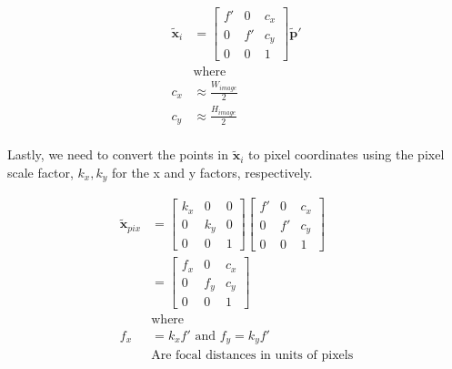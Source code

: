 \begin{equation}
    \begin{aligned}
        \tilde{\mathbf{x}}_{i} &= \begin{bmatrix}
            f' & 0 & c_x \\ 0 & f' & c_y \\ 0 & 0 & 1 
        \end{bmatrix} \tilde{\mathbf{p}}' \\
        &\text{where} \\
        c_x &\approx \frac{W_{image}}{2} \\
        c_y &\approx \frac{H_{image}}{2} \\
    \end{aligned}
    \label{eq:perspective-projection}
\end{equation}

Lastly, we need to convert the points in $\tilde{\mathbf{x}}_i$ to pixel coordinates using the pixel scale factor, $k_x,k_y$ for the x and y factors, respectively.

\begin{equation}
    \begin{aligned}
        \tilde{\mathbf{x}}_{pix} &= \begin{bmatrix}
            k_x & 0& 0 \\ 0 & k_y & 0 \\ 0 & 0 & 1
        \end{bmatrix} \begin{bmatrix}
            f' & 0 & c_x \\ 0 & f' & c_y \\ 0 & 0 & 1 
        \end{bmatrix} \\
        & = \begin{bmatrix}
            f_x & 0 & c_x \\ 0 & f_y & c_y \\ 0 & 0 & 1 
        \end{bmatrix}\\
        &\text{where}\\
        f_x &= k_x f' \text{        and        } f_y = k_y f' \\
        &\text{Are focal distances in units of pixels} 
    \end{aligned}
\end{equation}